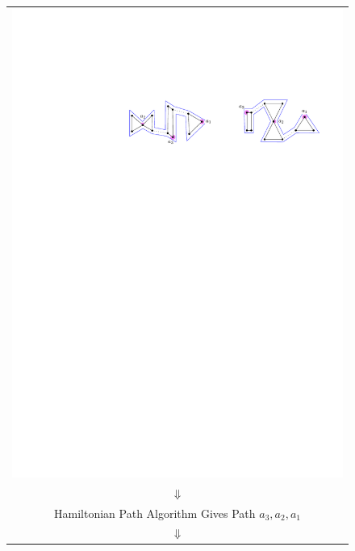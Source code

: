 \documentclass[11pt]{patmorin}
\begin{document}
\begin{figure}
\begin{center}
\begin{tabular}{c}
     \includegraphics{img/example-3} \\[2ex]
     $\Downarrow$ \\
     Hamiltonian Path Algorithm Gives Path $a_3,a_2,a_1$ \\[2ex]
     $\Downarrow$ \\

\end{tabular}
\end{center}
\end{figure}
\end{document}
